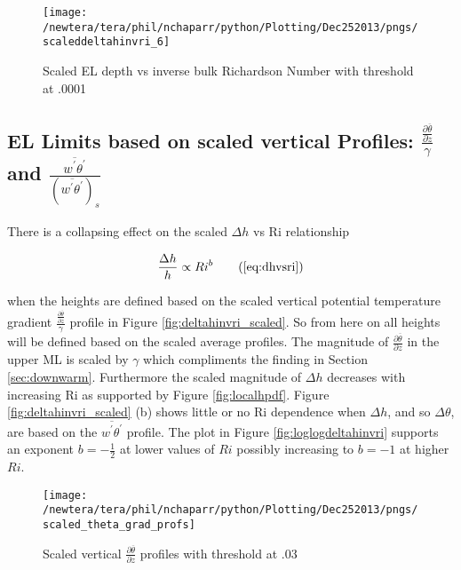 \begin{figure}[htbp]
    \centering
    \texttt{[image: /newtera/tera/phil/nchaparr/python/Plotting/Dec252013/pngs/scaleddeltahinvri\_6]}
    \caption{Scaled EL depth vs inverse bulk Richardson Number with threshold at .0001}
    \label{fig:scaledeltahinvri2}   %
\end{figure}

\clearpage
\subsection{\acs{EL} Limits based on scaled vertical Profiles: $\frac{\frac{\partial \overline{\theta}}{\partial z}}{\gamma}$ and $\frac{\overline{w^{'}\theta^{'}}}{(\overline{w^{'}\theta^{'}})_{s}}$}
\label{subsec:ellimscaledprof}

There is a collapsing effect on the scaled $\Delta h$ vs \acs{Ri} relationship 

\begin{equation}
\frac{\Delta h}{h} \propto Ri ^{b} \tag{\ref{eq:dhvsri}}
\end{equation}


when
the heights are defined based on the scaled vertical potential temperature gradient 
$\frac{\frac{\partial \overline{\theta}}{\partial z}}{\gamma}$ profile in Figure \ref{fig:deltahinvri_scaled}.  So from here on all heights will be defined based on the scaled average profiles.  The magnitude of $\frac{\partial \overline{\theta}}{\partial z}$ in the upper \acs{ML} is scaled by $\gamma$ which compliments the finding in Section \ref{sec:downwarm}.  Furthermore the scaled magnitude of $\Delta h$ decreases with increasing \acs{Ri} as supported by Figure \ref{fig:localhpdf}.  Figure \ref{fig:deltahinvri_scaled} (b) shows little or no \acs{Ri} dependence when $\Delta h$, and so $\Delta \theta$, are based on the $\overline{w^{'}\theta^{'}}$ profile.  The plot in Figure \ref{fig:loglogdeltahinvri} supports an exponent $b = -\frac{1}{2}$ at lower values of $Ri$ possibly increasing to $b = -1$ at higher $Ri$.

\begin{figure}[htbp]
    \centering
    \texttt{[image: /newtera/tera/phil/nchaparr/python/Plotting/Dec252013/pngs/scaled\_theta\_grad\_profs]}
    \caption{Scaled vertical $\frac{\partial \overline{\theta}}{\partial z}$ profiles with threshold at .03}
    \label{fig:thresh3}   %
\end{figure}

